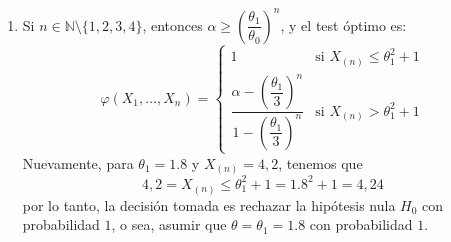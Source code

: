 \documentclass[12pt]{article}
\newcommand{\N}{\mathbb{N}}
\begin{document}
\begin{ejercicio}
\begin{enumerate}[label=\alph*)]
\begin{enumerate}
$$\begin{cases}
                    0.1 \left( \dfrac{5}{3} \right)^4 \approx 0,7716 &\quad n=4
                \end{cases}$$
                o sea, asumir que $\theta = \theta_1 = 1.8$ con la respectiva probabilidad, según $n \in \{1,2,3,4\}$.
                \item Si $n \in \N \setminus \{1,2,3,4\}$, entonces $\alpha \geq \left( \dfrac{\theta_1}{\theta_0} \right)^{n}$, y el
                test óptimo es:
                $$\varphi(X_1, \ldots, X_n) = 
                \begin{cases}
                    1 &\text{si } X_{(n)} \leq \theta_1^2 + 1 \\
                    \dfrac{\alpha - \left( \dfrac{\theta_1}{3} \right)^{n}}{1 - \left( \dfrac{\theta_1}{3} \right)^{n}} &\text{si } X_{(n)} > \theta_1^2 + 1
                \end{cases}$$
                Nuevamente, para $\theta_1 = 1.8$ y $X_{(n)} = 4,2$, tenemos que 
                $$4,2 = X_{(n)} \leq \theta_1^2 + 1 = 1.8^2 + 1 = 4,24$$
                por lo tanto, la decisión tomada es rechazar la hipótesis nula $H_0$ con probabilidad $1$,
                o sea, asumir que $\theta = \theta_1 = 1.8$ con probabilidad $1$.
            \end{enumerate}
        \end{enumerate}
    \end{ejercicio}
    
    \newpage
\end{document}
